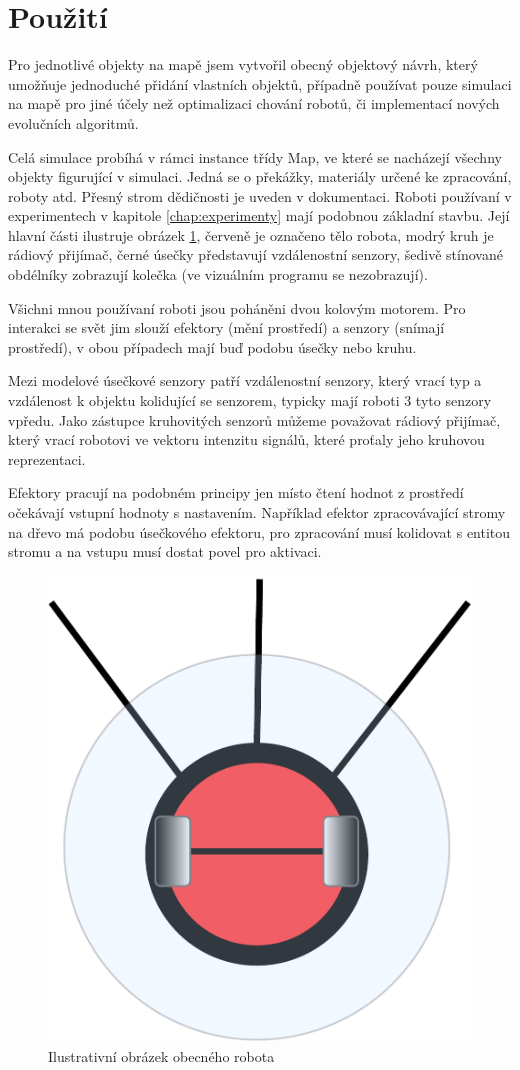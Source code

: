 \section*{Použití}
Pro jednotlivé objekty na mapě jsem vytvořil obecný objektový návrh, který umožňuje jednoduché přidání vlastních objektů, případně používat pouze simulaci na mapě pro jiné účely než optimalizaci chování robotů, či implementací nových evolučních algoritmů.
\par
Celá simulace probíhá v rámci instance třídy Map, ve které se nacházejí všechny objekty figurující v simulaci. Jedná se o překážky, materiály určené ke zpracování, roboty atd. Přesný strom dědičnosti je uveden v dokumentaci. Roboti používaní v experimentech v kapitole \ref{chap:experimenty} mají podobnou základní stavbu. Její hlavní části ilustruje obrázek \ref{obr03:robotModel}, červeně je označeno tělo robota, modrý kruh je rádiový přijímač, černé úsečky představují vzdálenostní senzory, šedivě stínované obdélníky zobrazují kolečka (ve vizuálním programu se nezobrazují).
\par 
Všichni mnou používaní roboti jsou poháněni dvou kolovým motorem. Pro interakci se svět jim slouží efektory (mění prostředí) a senzory (snímají prostředí), v obou případech mají buď podobu úsečky nebo kruhu.
\par
 Mezi modelové úsečkové senzory patří vzdálenostní senzory, který vrací typ a vzdálenost k objektu kolidující se senzorem, typicky mají roboti 3 tyto senzory vpředu. Jako zástupce kruhovitých senzorů můžeme považovat rádiový přijímač, který vrací robotovi ve vektoru intenzitu signálů, které proťaly jeho kruhovou reprezentaci.
 \par 
 Efektory pracují na podobném principy jen místo čtení hodnot z prostředí očekávají vstupní hodnoty s nastavením. Například efektor zpracovávající stromy na dřevo má podobu úsečkového efektoru, pro zpracování musí kolidovat s entitou stromu a na vstupu musí dostat povel pro aktivaci. 
 \begin{figure}[h]\centering
	\includegraphics[scale=0.3]{../img/RobotModel}
	\caption{Ilustrativní obrázek obecného robota}
	\label{obr03:robotModel}
\end{figure}
